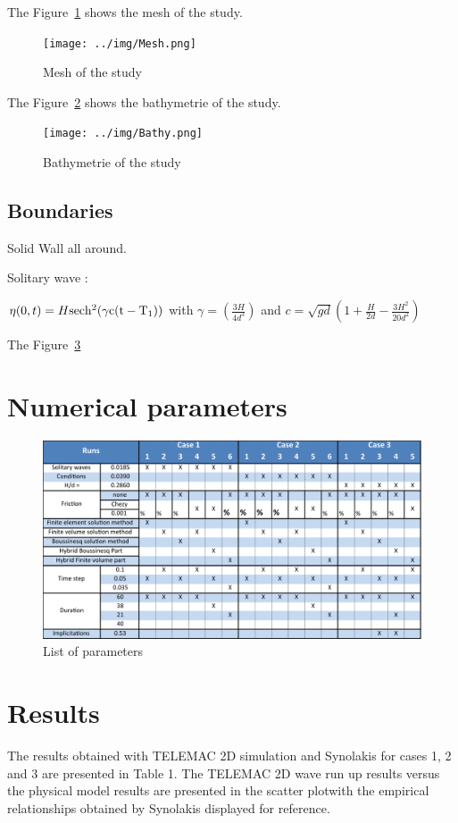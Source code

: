 The Figure~\ref{fig:tests:mesh} shows the mesh of the study.
\begin{figure}
\centering
\texttt{[image: ../img/Mesh.png]}
\caption{Mesh of the study}\label{fig:tests:mesh}
\end{figure}


The Figure~\ref{fig:tests:bathy} shows the bathymetrie of the study.
\begin{figure}
\centering
\texttt{[image: ../img/Bathy.png]}
\caption{Bathymetrie of the study}\label{fig:tests:bathy}
\end{figure}

\subsection{Boundaries}

Solid Wall all around.

Solitary wave :

$\eta(0,t) = H\rm{sec }h^{2}(\gamma c(t-T_{1}))$ with $\gamma=(\frac{3H}{4d^{3}})$ and
$c=\sqrt{gd}(1+\frac{H}{2d}-\frac{3H^{2}}{20d^{2}})$

The Figure~\ref{fig:tests:params}
\section{Numerical parameters}
\begin{figure}
\centering
\includegraphics[width=.6\textwidth]{img/run_param.png}
\caption{List of parameters}\label{fig:tests:params}
\end{figure}

\section{Results}

The results obtained with TELEMAC 2D simulation and  Synolakis for cases 1, 2
and 3 are presented in Table 1. The TELEMAC 2D wave run up results versus the
physical model results are presented in the scatter plotwith the empirical
relationships obtained by Synolakis displayed for reference.

